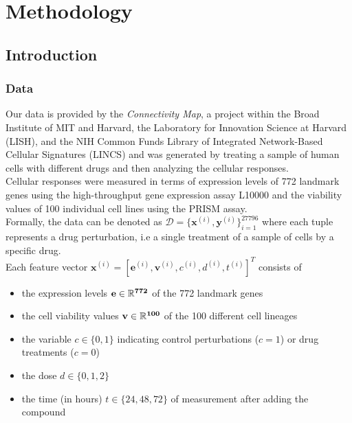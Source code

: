 \documentclass[bsc,frontabs,twoside,singlespacing,parskip,deptreport]{infthesis}     %
\begin{document}


\chapter{Methodology}\label{methodology}
\section{Introduction}
\subsection{Data}
Our data is provided by the \textit{Connectivity Map}, a project within the Broad Institute of MIT and Harvard, the Laboratory for Innovation Science at Harvard (LISH), and the NIH Common Funds Library of Integrated Network-Based Cellular Signatures (LINCS) and was generated by treating a sample of human cells with different drugs and then analyzing the cellular responses. \\ Cellular responses were measured in terms of expression levels of 772 landmark genes using the high-throughput gene expression assay L10000 and the viability values of 100 individual cell lines using the PRISM assay.\\
Formally, the data can be denoted as \(\mathscr{D}=\{\mathbf{x}^{(i)},\mathbf{y}^{(i)}\}_{i=1}^{27796}\) where each tuple represents a drug perturbation, i.e a single treatment of a sample of cells by a specific drug.
\\ Each feature vector \(\mathbf{x}^{(i)}=[\mathbf{e}^{(i)},\mathbf{v}^{(i)}, c^{(i)},d^{(i)},t^{(i)}]^{T}\) consists of 
\begin{itemize}
    \item the expression levels \(\bf{e} \in \mathbb{R}^{772}\) of the 772 landmark genes
    \item the cell viability values \(\bf{v} \in \mathbb{R}^{100}\) of the 100 different cell lineages
    \item the variable \(c \in \{0,1\}\) indicating control perturbations (\(c=1\)) or drug treatments (\(c=0\))
    \item the dose \(d \in \{0,1,2\}\)
    \item the time (in hours) \(t \in \{24,48,72\}\) of measurement after adding the compound
    
\end{itemize}
\end{document}
